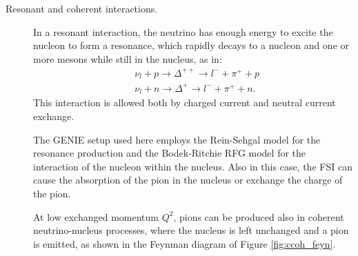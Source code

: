 \begin{description}
\item[Resonant and coherent interactions.] In a resonant interaction, the neutrino has enough energy to excite the nucleon to form a resonance, which rapidly decays to a nucleon and one or more mesons while still in the nucleus, as in:
\begin{align}
&\nu_l + p \rightarrow \Delta^{++} \rightarrow l^- + \pi^+ + p \\
&\nu_l + n \rightarrow \Delta^{+} \rightarrow l^- + \pi^+ + n.
\end{align}
This interaction is allowed both by charged current and neutral current exchange.

The GENIE setup used here employs the Rein-Sehgal model \cite{Rein:1980wg} for the resonance production and the Bodek-Ritchie RFG model \cite{Bodek:2011ps} for the interaction of the nucleon within the nucleus. Also in this case, the FSI can cause the absorption of the pion in the nucleus or exchange the charge of the pion.

At low exchanged momentum $Q^2$, pions can be produced also in coherent neutrino-nucleus processes, where the nucleus is left unchanged and a pion is emitted, as shown in the Feynman diagram of Figure \ref{fig:ccoh_feyn}.


\end{description}
